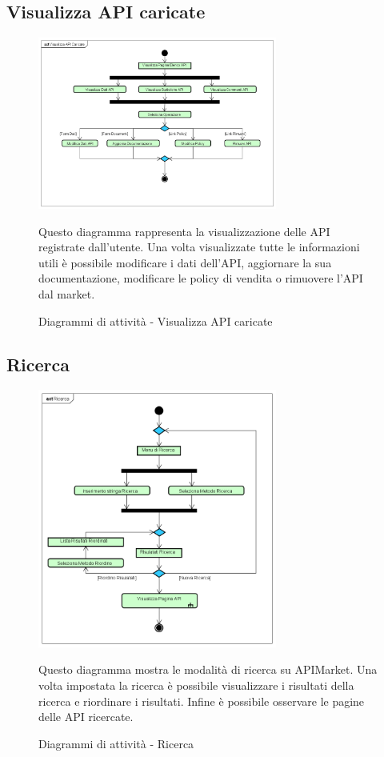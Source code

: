{	\subsection{Visualizza API caricate}{
		\begin{figure}[ht]
			\centering
			\includegraphics[width=0.7\textwidth]{img/visualizzaApiCaricate}
			\caption{Diagrammi di attività - Visualizza API caricate}
			Questo diagramma rappresenta la visualizzazione delle API registrate dall'utente. Una volta visualizzate tutte le informazioni utili è possibile modificare i dati dell'API, aggiornare la sua documentazione, modificare le policy di vendita o rimuovere l'API dal market. 
		\end{figure}	
	}
	\subsection{Ricerca}{
		\begin{figure}[ht]
			\centering
			\includegraphics[width=0.7\textwidth]{img/ricerca}
			\caption{Diagrammi di attività - Ricerca}
			Questo diagramma mostra le modalità di ricerca su APIMarket. Una volta impostata la ricerca è possibile visualizzare i risultati della ricerca e riordinare i risultati. Infine è possibile osservare le pagine delle API ricercate. 
		\end{figure}	
	}
}
